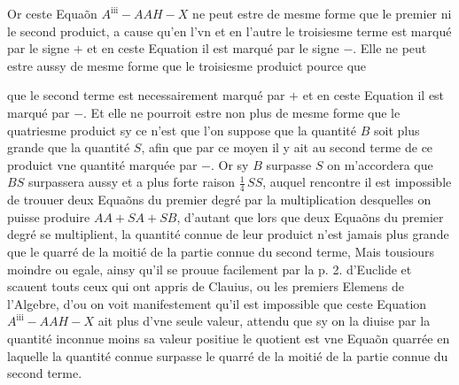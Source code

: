 \documentclass[11pt,a4paper]{article}
\begin{document}
Or ceste Equaõn $A^{\mathrm{iii}} - AAH - X$ ne peut estre de mesme forme que le premier ni le second produict, a cause qu'en l'vn et en l'autre le troisiesme terme est marqué par le signe $+$ et en ceste Equation il est marqué par le signe $-$. Elle ne peut estre aussy de mesme forme que le troisiesme produict pource que


que le second terme est necessairement marqué par $+$ et en ceste Equation il est marqué par $-$. Et elle ne pourroit estre non plus de mesme forme que le quatriesme produict sy ce n'est que l'on suppose que la quantité $B$ soit plus grande que la quantité $S$, afin que par ce moyen il y ait au second terme de ce produict vne quantité marquée par $-$. Or sy $B$ surpasse $S$ on m'accordera que $BS$ surpassera aussy  et a plus forte raison $\frac{1}{4}\,SS$, auquel rencontre il est impossible de trouuer deux Equaõns du premier degré par la multiplication desquelles on puisse produire $AA + SA + SB$, d'autant que lors que deux Equaõns du premier degré se multiplient, la quantité connue de leur produict n'est jamais plus grande que le quarré de la moitié de la partie connue du second terme, Mais tousiours moindre ou egale, ainsy qu'il se prouue facilement par la \quad p. 2. d'Euclide et scauent touts ceux qui ont appris de Clauius,  ou les premiers \struck{\ill{}} Elemens de l'Algebre, d'ou on voit manifestement qu'il est impossible que ceste Equation $A^{\mathrm{iii}} - AAH - X$ ait plus d'vne seule valeur, attendu que sy on la diuise par la quantité inconnue  moins sa valeur positiue le quotient est vne Equaõn quarrée en laquelle la quantité connue surpasse le quarré de la moitié de la partie connue du second terme.
\end{document}

